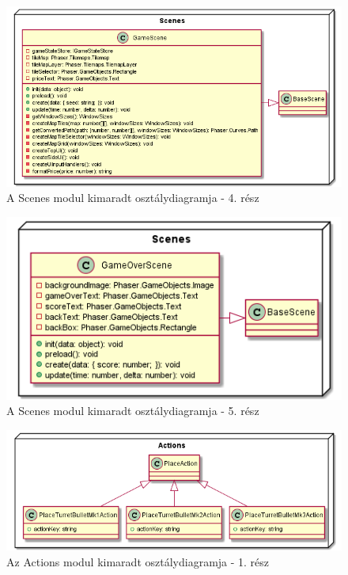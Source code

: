 \begin{figure}[h!]
	\centering
	\includegraphics[scale=0.68]{kepek/uml/scenes/scene-pt5.png}
	\caption{A Scenes modul kimaradt osztálydiagramja - 4. rész}
	\label{fig:uml:scene-pt5}
\end{figure}

\begin{figure}[h!]
	\centering
	\includegraphics[scale=0.75]{kepek/uml/scenes/scene-pt6.png}
	\caption{A Scenes modul kimaradt osztálydiagramja - 5. rész}
	\label{fig:uml:scene-pt6}
\end{figure}



\begin{figure}[h!]
	\centering
	\includegraphics[width=1.015\textwidth]{kepek/uml/actions/action-pt2.png}
	\caption{Az Actions modul kimaradt osztálydiagramja - 1. rész}
	\label{fig:uml:action-pt2}
\end{figure}

